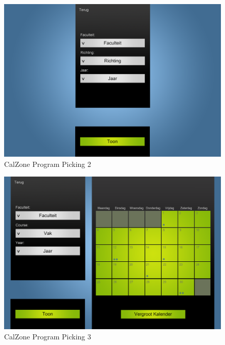 \begin{center}
\begin{figure}[H]
\caption{CalZone Program Picking 2}
\centerline{\includegraphics[scale=0.4]{img/Calzoneprogrammepicking2}}
\label{fig:CalZone Program Picking 2}
\end{figure}

\begin{figure}[H]
\caption{CalZone Program Picking 3}
\centerline{\includegraphics[scale=0.4]{img/Calzoneprogrammepicking3}}
\label{fig:CalZone Program Picking 3}
\end{figure}



\end{center}

